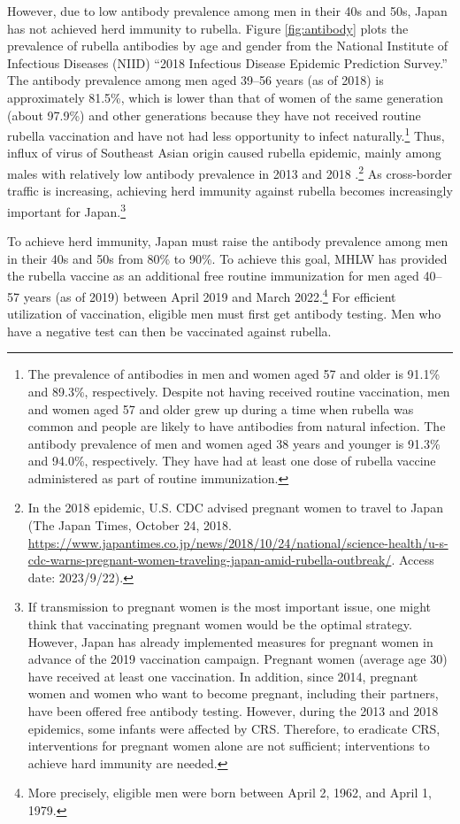 \documentclass[
]{article}
\begin{document}
However, due to low antibody prevalence among men in their 40s and 50s, Japan has not achieved herd immunity to rubella. Figure \ref{fig:antibody} plots the prevalence of rubella antibodies by age and gender from the National Institute of Infectious Diseases (NIID) ``2018 Infectious Disease Epidemic Prediction Survey.'' The antibody prevalence among men aged 39--56 years (as of 2018) is approximately 81.5\%, which is lower than that of women of the same generation (about 97.9\%) and other generations because they have not received routine rubella vaccination and have not had less opportunity to infect naturally.\footnote{The prevalence of antibodies in men and women aged 57 and older is 91.1\% and 89.3\%, respectively. Despite not having received routine vaccination, men and women aged 57 and older grew up during a time when rubella was common and people are likely to have antibodies from natural infection. The antibody prevalence of men and women aged 38 years and younger is 91.3\% and 94.0\%, respectively. They have had at least one dose of rubella vaccine administered as part of routine immunization.} Thus, influx of virus of Southeast Asian origin caused rubella epidemic, mainly among males with relatively low antibody prevalence in 2013 and 2018 \citep{NIID2019}.\footnote{In the 2018 epidemic, U.S. CDC advised pregnant women to travel to Japan (The Japan Times, October 24, 2018. \url{https://www.japantimes.co.jp/news/2018/10/24/national/science-health/u-s-cdc-warns-pregnant-women-traveling-japan-amid-rubella-outbreak/}. Access date: 2023/9/22).} As cross-border traffic is increasing, achieving herd immunity against rubella becomes increasingly important for Japan.\footnote{If transmission to pregnant women is the most important issue, one might think that vaccinating pregnant women would be the optimal strategy. However, Japan has already implemented measures for pregnant women in advance of the 2019 vaccination campaign. Pregnant women (average age 30) have received at least one vaccination. In addition, since 2014, pregnant women and women who want to become pregnant, including their partners, have been offered free antibody testing. However, during the 2013 and 2018 epidemics, some infants were affected by CRS. Therefore, to eradicate CRS, interventions for pregnant women alone are not sufficient; interventions to achieve hard immunity are needed.}

To achieve herd immunity, Japan must raise the antibody prevalence among men in their 40s and 50s from 80\% to 90\%. To achieve this goal, MHLW has provided the rubella vaccine as an additional free routine immunization for men aged 40--57 years (as of 2019) between April 2019 and March 2022.\footnote{More precisely, eligible men were born between April 2, 1962, and April 1, 1979.} For efficient utilization of vaccination, eligible men must first get antibody testing. Men who have a negative test can then be vaccinated against rubella.
\end{document}
